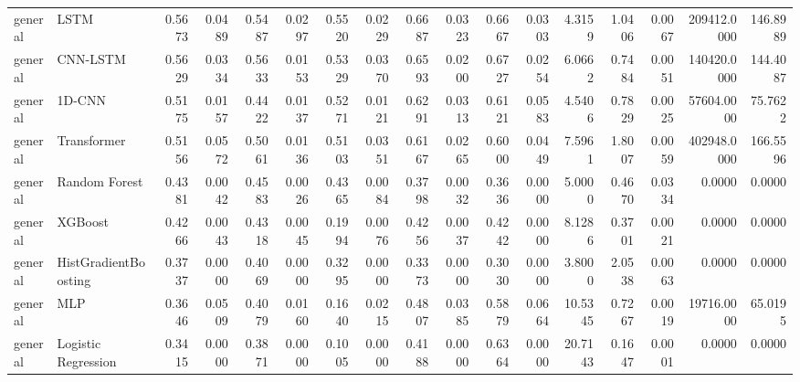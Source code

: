 \begin{tabular}{llrrrrrrrrrrrrrrr}
general & LSTM & 0.5673 & 0.0489 & 0.5487 & 0.0297 & 0.5520 & 0.0229 & 0.6687 & 0.0323 & 0.6667 & 0.0303 & 4.3159 & 1.0406 & 0.0067 & 209412.0000 & 146.8989 \\
general & CNN-LSTM & 0.5629 & 0.0334 & 0.5633 & 0.0153 & 0.5329 & 0.0370 & 0.6593 & 0.0200 & 0.6727 & 0.0254 & 6.0662 & 0.7484 & 0.0051 & 140420.0000 & 144.4087 \\
general & 1D-CNN & 0.5175 & 0.0157 & 0.4422 & 0.0137 & 0.5271 & 0.0121 & 0.6291 & 0.0313 & 0.6121 & 0.0583 & 4.5406 & 0.7829 & 0.0025 & 57604.0000 & 75.7622 \\
general & Transformer & 0.5156 & 0.0572 & 0.5061 & 0.0136 & 0.5103 & 0.0351 & 0.6167 & 0.0265 & 0.6000 & 0.0449 & 7.5961 & 1.8007 & 0.0059 & 402948.0000 & 166.5596 \\
general & Random Forest & 0.4381 & 0.0042 & 0.4583 & 0.0026 & 0.4365 & 0.0084 & 0.3798 & 0.0032 & 0.3636 & 0.0000 & 5.0000 & 0.4670 & 0.0334 & 0.0000 & 0.0000 \\
general & XGBoost & 0.4266 & 0.0043 & 0.4318 & 0.0045 & 0.1994 & 0.0076 & 0.4256 & 0.0037 & 0.4242 & 0.0000 & 8.1286 & 0.3701 & 0.0021 & 0.0000 & 0.0000 \\
general & HistGradientBoosting & 0.3737 & 0.0000 & 0.4069 & 0.0000 & 0.3295 & 0.0000 & 0.3373 & 0.0000 & 0.3030 & 0.0000 & 3.8000 & 2.0538 & 0.0063 & 0.0000 & 0.0000 \\
general & MLP & 0.3646 & 0.0509 & 0.4079 & 0.0160 & 0.1640 & 0.0215 & 0.4807 & 0.0385 & 0.5879 & 0.0664 & 10.5345 & 0.7267 & 0.0019 & 19716.0000 & 65.0195 \\
general & Logistic Regression & 0.3415 & 0.0000 & 0.3871 & 0.0000 & 0.1005 & 0.0000 & 0.4188 & 0.0000 & 0.6364 & 0.0000 & 20.7143 & 0.1647 & 0.0001 & 0.0000 & 0.0000 \\
\bottomrule
\end{tabular}
